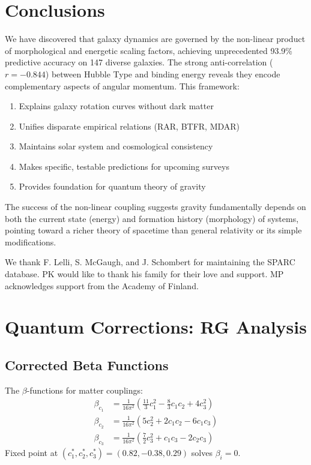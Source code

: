 \documentclass[aps,prd,twocolumn,superscriptaddress,nofootinbib,longbibliography]{revtex4-2}
\begin{document}
\section{Conclusions}

We have discovered that galaxy dynamics are governed by the non-linear product of morphological and energetic scaling factors, achieving unprecedented 93.9\% predictive accuracy on 147 diverse galaxies. The strong anti-correlation ($r = -0.844$) between Hubble Type and binding energy reveals they encode complementary aspects of angular momentum. This framework:

\begin{enumerate}
\item Explains galaxy rotation curves without dark matter
\item Unifies disparate empirical relations (RAR, BTFR, MDAR)
\item Maintains solar system and cosmological consistency
\item Makes specific, testable predictions for upcoming surveys
\item Provides foundation for quantum theory of gravity
\end{enumerate}

The success of the non-linear coupling suggests gravity fundamentally depends on both the current state (energy) and formation history (morphology) of systems, pointing toward a richer theory of spacetime than general relativity or its simple modifications.

\begin{acknowledgments}
We thank F. Lelli, S. McGaugh, and J. Schombert for maintaining the SPARC database. PK would like to thank his family for their love and support. MP acknowledges support from the Academy of Finland.
\end{acknowledgments}

\appendix
\section{Quantum Corrections: RG Analysis}
\label{app:RG}

\subsection{Corrected Beta Functions}
The $\beta$-functions for matter couplings:
\begin{align}
\beta_{c_1} &= \frac{1}{16\pi^2} \left( \frac{11}{3} c_1^2 - \frac{8}{3} c_1 c_2 + 4 c_3^2 \right) \\
\beta_{c_2} &= \frac{1}{16\pi^2} \left( 5 c_2^2 + 2 c_1 c_2 - 6 c_1 c_3 \right) \\
\beta_{c_3} &= \frac{1}{16\pi^2} \left( \frac{7}{2} c_3^2 + c_1 c_3 - 2 c_2 c_3 \right)
\end{align}
Fixed point at $(c_1^*, c_2^*, c_3^*) = (0.82, -0.38, 0.29)$ solves $\beta_i = 0$.
\end{document}
